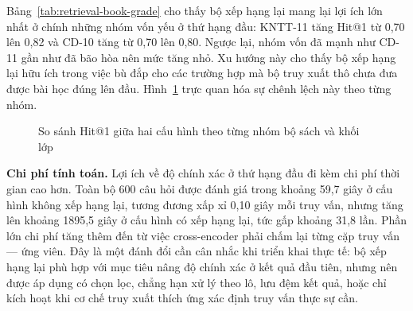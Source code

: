 \documentclass[../DoAn.tex]{subfiles}
\begin{document}
Bảng~\ref{tab:retrieval-book-grade} cho thấy bộ xếp hạng lại mang lại lợi ích lớn nhất ở chính những nhóm vốn yếu ở thứ hạng đầu: KNTT-11 tăng Hit@1 từ 0,70 lên 0,82 và CD-10 tăng từ 0,70 lên 0,80. Ngược lại, nhóm vốn đã mạnh như CD-11 gần như đã bão hòa nên mức tăng nhỏ. Xu hướng này cho thấy bộ xếp hạng lại hữu ích trong việc bù đắp cho các trường hợp mà bộ truy xuất thô chưa đưa được bài học đúng lên đầu. Hình~\ref{fig:hit1-book-grade} trực quan hóa sự chênh lệch này theo từng nhóm.

\begin{figure}[H]
    \centering
    \caption{So sánh Hit@1 giữa hai cấu hình theo từng nhóm bộ sách và khối lớp}
    \label{fig:hit1-book-grade}
\end{figure}

\textbf{Chi phí tính toán.} Lợi ích về độ chính xác ở thứ hạng đầu đi kèm chi phí thời gian cao hơn. Toàn bộ 600 câu hỏi được đánh giá trong khoảng 59,7 giây ở cấu hình không xếp hạng lại, tương đương xấp xỉ 0,10 giây mỗi truy vấn, nhưng tăng lên khoảng 1895,5 giây ở cấu hình có xếp hạng lại, tức gấp khoảng 31,8 lần. Phần lớn chi phí tăng thêm đến từ việc cross-encoder phải chấm lại từng cặp truy vấn --- ứng viên. Đây là một đánh đổi cần cân nhắc khi triển khai thực tế: bộ xếp hạng lại phù hợp với mục tiêu nâng độ chính xác ở kết quả đầu tiên, nhưng nên được áp dụng có chọn lọc, chẳng hạn xử lý theo lô, lưu đệm kết quả, hoặc chỉ kích hoạt khi cơ chế truy xuất thích ứng xác định truy vấn thực sự cần.
\end{document}
